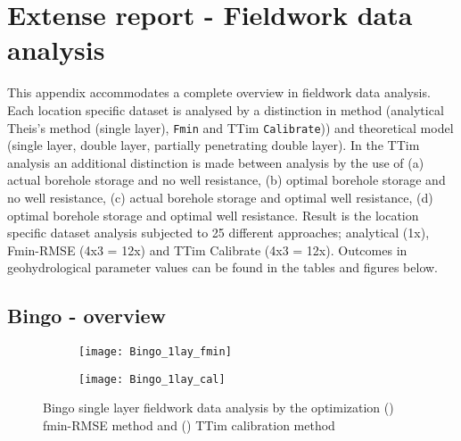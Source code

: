 \chapter{Extense report - Fieldwork data analysis}
\label{chapter:Extense_fieldwork_analysis}

This appendix accommodates a complete overview in fieldwork data analysis. Each location specific dataset is analysed by a distinction in method (analytical Theis's method (single layer), \texttt{Fmin} and TTim \texttt{Calibrate})) and theoretical model (single layer, double layer, partially penetrating double layer). In the TTim analysis an additional distinction is made between analysis by the use of (a) actual borehole storage and no well resistance, (b) optimal borehole storage and no well resistance, (c) actual borehole storage and optimal well resistance, (d) optimal borehole storage and optimal well resistance. Result is the location specific dataset analysis subjected to 25 different approaches; analytical (1x), Fmin-RMSE (4x3 = 12x) and TTim Calibrate (4x3 = 12x). Outcomes in geohydrological parameter values can be found in the tables and figures below.   

\clearpage\section{Bingo - overview}
\label{sec:Bingo_overview}

\begin{figure}[h!]
	\centering
	\begin{subfigure}[b]{0.65\linewidth}
		\centering\texttt{[image: Bingo\_1lay\_fmin]}
		\captionsetup{justification=centering}		
		\caption{\label{fig:Bingo_1lay_fmin}}
		\end{subfigure}\vfill
	\begin{subfigure}[b]{0.65\linewidth}
		\centering\texttt{[image: Bingo\_1lay\_cal]}
		\captionsetup{justification=centering}		
		\caption{\label{fig:Bingo_1lay_cal}}
		\end{subfigure}
	\captionsetup{justification=centering}	
	\caption{Bingo single layer fieldwork data analysis by the optimization () fmin-RMSE method and () TTim calibration method} 
	\label{fig:Bingo_1lay_analysis}
\end{figure} 

